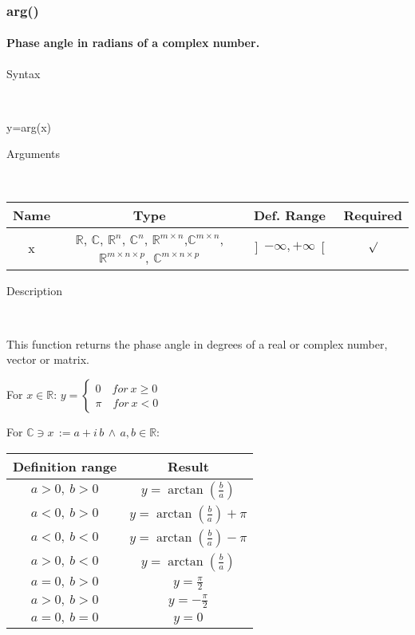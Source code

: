 \newpage
\subsubsection*{\hypertarget{arg}{}{\Large arg()}}


\paragraph{\label{par:arg}Phase angle in radians of a complex number.}

\begin{description}
\item [Syntax]~
\end{description}
y=arg(x)

\begin{description}
\item [Arguments]~
\end{description}
\begin{tabular}{|c|c|c|c|}
\hline 
Name&
Type&
Def. Range&
Required\tabularnewline
\hline
\hline 
x&
$\mathbb{R}$, $\mathbb{C}$, $\mathbb{R}^{n}$, $\mathbb{C}^{n}$,
$\mathbb{\mathbb{R}}^{m\times n}$,$\mathbb{\mathbb{C}}^{m\times n}$,
$\mathbb{\mathbb{R}}^{m\times n\times p}$, $\mathbb{\mathbb{C}}^{m\times n\times p}$ &
$\left]-\infty,+\infty\right[$&
$\surd$\tabularnewline
\hline
\end{tabular}

\begin{description}
\item [Description]~
\end{description}
This function returns the phase angle in degrees of a real or complex
number, vector or matrix.

\medskip{}
For $x\in\mathbb{R}$: $y=\left\{ \begin{array}{l}
0\quad for\: x\geq0\\
\pi\quad for\: x<0\end{array}\right.$
\medskip{}

For $\mathbb{\mathbb{C}}\ni x\,:=a+i\, b\,\wedge\, a,b\in\mathbb{R}$:

\medskip{}
\begin{tabular}{|c|c|}
\hline 
Definition range&
Result\tabularnewline
\hline
\hline 
$a>0,\: b>0$&
$y=\arctan\left(\frac{b}{a}\right)$\tabularnewline
\hline 
$a<0,\: b>0$&
$y=\arctan\left(\frac{b}{a}\right)+\pi$\tabularnewline
\hline 
$a<0,\: b<0$&
$y=\arctan\left(\frac{b}{a}\right)-\pi$\tabularnewline
\hline 
$a>0,\: b<0$&
$y=\arctan\left(\frac{b}{a}\right)$\tabularnewline
\hline 
$a=0,\: b>0$&
$y=\frac{\pi}{2}$\tabularnewline
\hline 
$a>0,\: b>0$&
$y=-\frac{\pi}{2}$\tabularnewline
\hline 
$a=0,\: b=0$&
$y=0$\tabularnewline
\hline
\end{tabular}
\medskip{}

